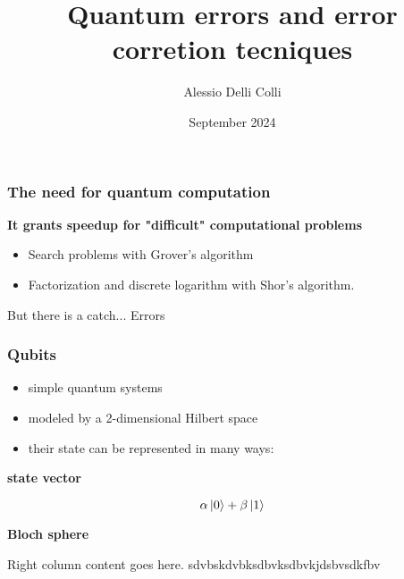 \documentclass{beamer}
\title{Quantum errors and error corretion tecniques}
\author{Alessio Delli Colli}
\date{September 2024}
\begin{document}
\maketitle

%

\begin{frame}
	\frametitle{The need for quantum computation}
	\textbf{It grants speedup for "difficult" computational problems}

	\pause
	\vspace{30pt}
	\begin{itemize}
		\item Search problems with Grover's algorithm
		      \vspace{30pt}
		      \pause
		\item Factorization and discrete logarithm with Shor's algorithm.


	\end{itemize}
	\vspace{20pt}
	\pause
	But there is a catch...
	\pause
	Errors
\end{frame}


\begin{frame}
	\frametitle{Qubits}
	\begin{itemize}
		\item simple quantum systems
		      \pause
		\item modeled by a 2-dimensional Hilbert space
		      \pause
		\item their state can be represented in many ways:
		      \pause
	\end{itemize}

	\vspace{10pt}

	\noindent
	\begin{minipage}{0.5\textwidth}
		\begin{center}
			\textbf{state vector}
		\end{center}
		\begin{equation*}
			\alpha \ket{0} + \beta \ket{1}
		\end{equation*}
	\end{minipage}
	\hfill
	\pause
	\begin{minipage}{0.48\textwidth}
		\begin{center}
			\textbf{Bloch sphere}
		\end{center}
		Right column content goes here.
		sdvbskdvbksdbvksdbvkjdsbvsdkfbv
	\end{minipage}
\end{frame}
\end{document}
